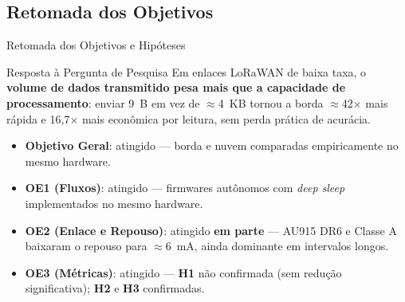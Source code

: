 \documentclass[
    aspectratio=169,
    11pt,
    brazil
]{beamer}
\begin{document}
\subsection{Retomada dos Objetivos}
\begin{frame}{Retomada dos Objetivos e Hipóteses}
  \begin{block}{Resposta à Pergunta de Pesquisa}
    \scriptsize Em enlaces LoRaWAN de baixa taxa, o \textbf{volume de dados transmitido pesa mais que a capacidade de processamento}: enviar 9~B em vez de $\approx$4~KB tornou a borda $\approx$42$\times$ mais rápida e 16,7$\times$ mais econômica por leitura, sem perda prática de acurácia.
  \end{block}
  \vspace{0.08cm}
  \begin{itemize}\scriptsize
    \setlength{\itemsep}{2.5pt}
    \item \textbf{Objetivo Geral}: atingido --- borda e nuvem comparadas empiricamente no mesmo hardware.
    \item \textbf{OE1 (Fluxos)}: atingido --- firmwares autônomos com \textit{deep sleep} implementados no mesmo hardware.
    \item \textbf{OE2 (Enlace e Repouso)}: atingido \textbf{em parte} --- AU915 DR6 e Classe A baixaram o repouso para $\approx$6~mA, ainda dominante em intervalos longos.
    \item \textbf{OE3 (Métricas)}: atingido --- \textbf{H1} não confirmada (sem redução significativa); \textbf{H2} e \textbf{H3} confirmadas.
  \end{itemize}
\end{frame}
\end{document}
